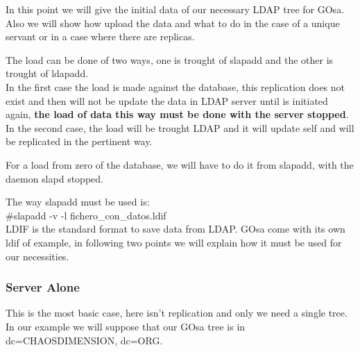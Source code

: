 In this point we will give the initial data of our necessary LDAP tree for GOsa. Also we will show how upload the data and what to do in the case of a unique servant or in a case where there are replicas. 

The load can be done of two ways, one is trought of slapadd and the other is trought of ldapadd.\\
In the first case the load is made against the database, this replication does not exist and then will not be update the data in LDAP server until is initiated again, \textbf{the load of data this way must be done with the server stopped}. In the second case, the load will be trought LDAP and it will update self and will be replicated in the pertinent way.

For a load from zero of the database, we will have to do it from slapadd, with the daemon slapd stopped. 

The way slapadd must be used is: \\

\noindent \#slapadd -v -l fichero\_con\_datos.ldif\\

LDIF is the standard format to save data from LDAP. GOsa come with its own ldif of example, in following two points we will explain how it must be used for our necessities.
\vspace{1cm}

\subsubsection{Server Alone}

This is the most basic case, here isn't replication and only we need a single tree. In our example we will suppose that our GOsa tree is in dc=CHAOSDIMENSION, dc=ORG.\\

